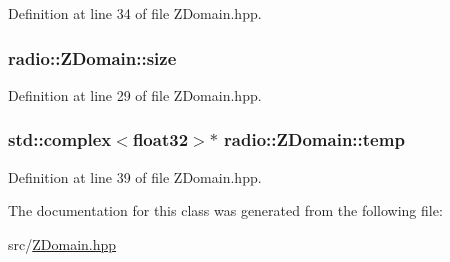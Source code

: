 Definition at line 34 of file Z\+Domain.\+hpp.

\hypertarget{classradio_1_1ZDomain_a4cd757a40cbd98b29a64557fab4b23f5}{
\subsubsection[{size}]{ radio\+::\+Z\+Domain\+::size}}\label{classradio_1_1ZDomain_a4cd757a40cbd98b29a64557fab4b23f5}


Definition at line 29 of file Z\+Domain.\+hpp.

\hypertarget{classradio_1_1ZDomain_aac575115f72d07c8e15178e9707592ce}{
\subsubsection[{temp}]{\setlength{\rightskip}{0pt plus 5cm}std\+::complex$<${\bf float32}$>$$\ast$ radio\+::\+Z\+Domain\+::temp}}\label{classradio_1_1ZDomain_aac575115f72d07c8e15178e9707592ce}


Definition at line 39 of file Z\+Domain.\+hpp.



The documentation for this class was generated from the following file\+:\begin{DoxyCompactItemize}
\item 
src/\hyperlink{ZDomain_8hpp}{Z\+Domain.\+hpp}\end{DoxyCompactItemize}
